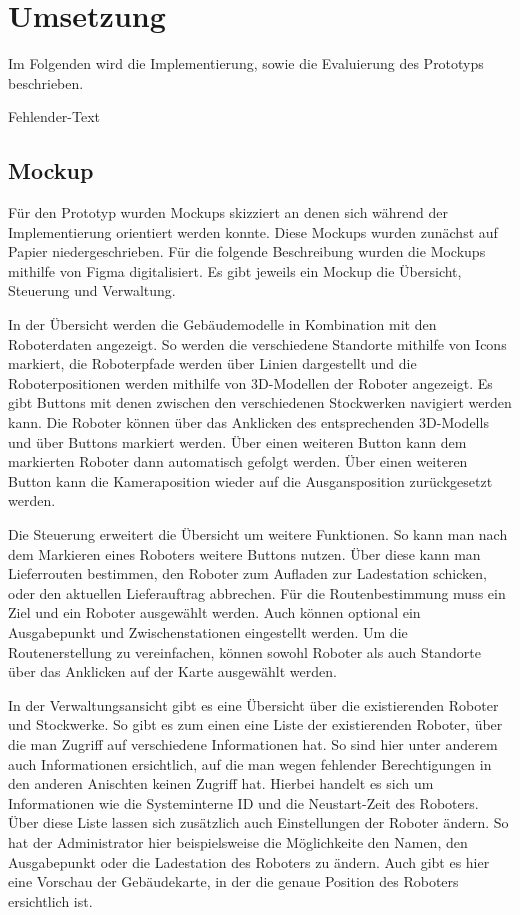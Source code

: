 \newpage
\section{Umsetzung}
Im Folgenden wird die Implementierung, sowie die Evaluierung des Prototyps beschrieben.

Fehlender-Text

\subsection{Mockup}

Für den Prototyp wurden Mockups skizziert an denen sich während der Implementierung orientiert werden konnte. Diese Mockups wurden zunächst auf Papier niedergeschrieben. Für die folgende Beschreibung wurden die Mockups mithilfe von Figma digitalisiert. Es gibt jeweils ein Mockup die Übersicht, Steuerung und Verwaltung.

In der Übersicht werden die Gebäudemodelle in Kombination mit den Roboterdaten angezeigt. So werden die verschiedene Standorte mithilfe von Icons markiert, die Roboterpfade werden über Linien dargestellt und die Roboterpositionen werden mithilfe von 3D-Modellen der Roboter angezeigt. Es gibt Buttons mit denen zwischen den verschiedenen Stockwerken navigiert werden kann. Die Roboter können über das Anklicken des entsprechenden 3D-Modells und über Buttons markiert werden. Über einen weiteren Button kann dem markierten Roboter dann automatisch gefolgt werden. Über einen weiteren Button kann die Kameraposition wieder auf die Ausgansposition zurückgesetzt werden.

Die Steuerung erweitert die Übersicht um weitere Funktionen. So kann man nach dem Markieren eines Roboters weitere Buttons nutzen. Über diese kann man Lieferrouten bestimmen, den Roboter zum Aufladen zur Ladestation schicken, oder den aktuellen Lieferauftrag abbrechen. Für die Routenbestimmung muss ein Ziel und ein Roboter ausgewählt werden. Auch können optional ein Ausgabepunkt und Zwischenstationen eingestellt werden. Um die Routenerstellung zu vereinfachen, können sowohl Roboter als auch Standorte über das Anklicken auf der Karte ausgewählt werden.

In der Verwaltungsansicht gibt es eine Übersicht über die existierenden Roboter und Stockwerke. So gibt es zum einen eine Liste der existierenden Roboter, über die man Zugriff auf verschiedene Informationen hat. So sind hier unter anderem auch Informationen ersichtlich, auf die man wegen fehlender Berechtigungen in den anderen Anischten keinen Zugriff hat. Hierbei handelt es sich um Informationen wie die Systeminterne \ac{ID} und die Neustart-Zeit des Roboters. Über diese Liste lassen sich zusätzlich auch Einstellungen der Roboter ändern. So hat der Administrator hier beispielsweise die Möglichkeite den Namen, den Ausgabepunkt oder die Ladestation des Roboters zu ändern. Auch gibt es hier eine Vorschau der Gebäudekarte, in der die genaue Position des Roboters ersichtlich ist.

